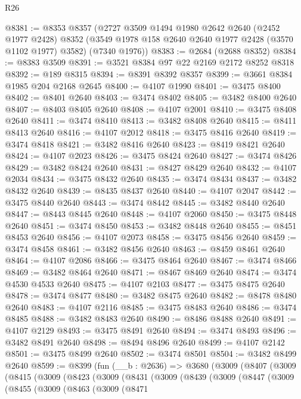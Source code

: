 \begin{lexlean}{R26}
\begin{coremodule}
@8381 := @8353
    @8357
    (@2727
      @3509
      @1494
      @1980
      @2642
      @2640
      (@2452 @1977 @2428)
      @8352
      (@3549 @1978 @158 @2640 @2640 @1977 @2428 (@3570 @1102 @1977) @3582)
      (@7340 @1976))
@8383 := @2684 (@2688 @8352)
@8384 := @8383 @3509
@8391 := @3521 @8384 @97 @22 @2169 @2172 @8252 @8318
@8392 := @189 @8315
@8394 := @8391 @8392 @8357
@8399 := @3661 @8384 @1985 @204 @2168 @2645
@8400 := @4107 @1990
@8401 := @3475 @8400
@8402 := @8401 @2640
@8403 := @3474 @8402
@8405 := @3482 @8400 @2640
@8407 := @8403 @8405 @2640
@8408 := @4107 @2001
@8410 := @3475 @8408 @2640
@8411 := @3474 @8410
@8413 := @3482 @8408 @2640
@8415 := @8411 @8413 @2640
@8416 := @4107 @2012
@8418 := @3475 @8416 @2640
@8419 := @3474 @8418
@8421 := @3482 @8416 @2640
@8423 := @8419 @8421 @2640
@8424 := @4107 @2023
@8426 := @3475 @8424 @2640
@8427 := @3474 @8426
@8429 := @3482 @8424 @2640
@8431 := @8427 @8429 @2640
@8432 := @4107 @2034
@8434 := @3475 @8432 @2640
@8435 := @3474 @8434
@8437 := @3482 @8432 @2640
@8439 := @8435 @8437 @2640
@8440 := @4107 @2047
@8442 := @3475 @8440 @2640
@8443 := @3474 @8442
@8445 := @3482 @8440 @2640
@8447 := @8443 @8445 @2640
@8448 := @4107 @2060
@8450 := @3475 @8448 @2640
@8451 := @3474 @8450
@8453 := @3482 @8448 @2640
@8455 := @8451 @8453 @2640
@8456 := @4107 @2073
@8458 := @3475 @8456 @2640
@8459 := @3474 @8458
@8461 := @3482 @8456 @2640
@8463 := @8459 @8461 @2640
@8464 := @4107 @2086
@8466 := @3475 @8464 @2640
@8467 := @3474 @8466
@8469 := @3482 @8464 @2640
@8471 := @8467 @8469 @2640
@8474 := @3474 @4530 @4533 @2640
@8475 := @4107 @2103
@8477 := @3475 @8475 @2640
@8478 := @3474 @8477
@8480 := @3482 @8475 @2640
@8482 := @8478 @8480 @2640
@8483 := @4107 @2116
@8485 := @3475 @8483 @2640
@8486 := @3474 @8485
@8488 := @3482 @8483 @2640
@8490 := @8486 @8488 @2640
@8491 := @4107 @2129
@8493 := @3475 @8491 @2640
@8494 := @3474 @8493
@8496 := @3482 @8491 @2640
@8498 := @8494 @8496 @2640
@8499 := @4107 @2142
@8501 := @3475 @8499 @2640
@8502 := @3474 @8501
@8504 := @3482 @8499 @2640
@8599 := @8399
    (fun (__b : @2636) =>
    @3680
      (@3009
        (@8407
          (@3009
            (@8415
              (@3009
                (@8423
                  (@3009
                    (@8431
                      (@3009
                        (@8439
                          (@3009
                            (@8447
                              (@3009
                                (@8455
                                  (@3009
                                    (@8463
                                      (@3009
                                        (@8471

\end{coremodule}
\end{lexlean}
